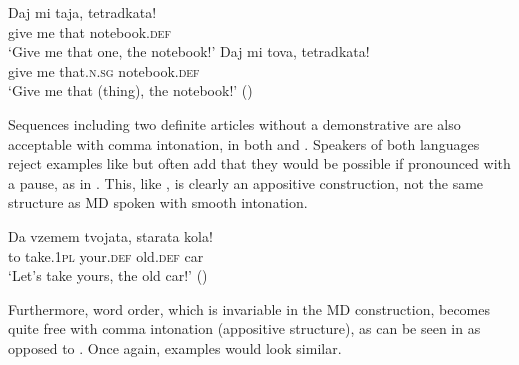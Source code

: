 \documentclass[output=paper]{langscibook}
\begin{document}
\ea
\ea \label{notebook2}
\gll Daj mi taja, tetradkata! \\
    give me that notebook.\textsc{def} \\
\glt `Give me that one, the notebook!'
\ex \label{notebook3}
\gll Daj mi tova, tetradkata! \\
    give me that.\textsc{n.sg} notebook.\textsc{def} \\
\glt `Give me that (thing), the notebook!' \hfill ()
\z
\z

\noindent Sequences including two definite articles without a demonstrative are also acceptable with comma intonation, in both  and . Speakers of both languages reject examples like  but often add that they would be possible if pronounced with a pause, as in . This, like , is clearly an appositive construction, not the same structure as MD spoken with smooth intonation.


\z
\ea \label{yours2}
\gll Da vzemem tvojata, starata kola!\\
    to take.\textsc{1pl} your.\textsc{def} old.\textsc{def} car\\
\glt `Let's take yours, the old car!' \hfill ()
\z

\noindent Furthermore, word order, which is invariable in the MD construction, becomes quite free with comma intonation (appositive structure), as can be seen in  as opposed to . Once again,  examples would look similar.
\end{document}
